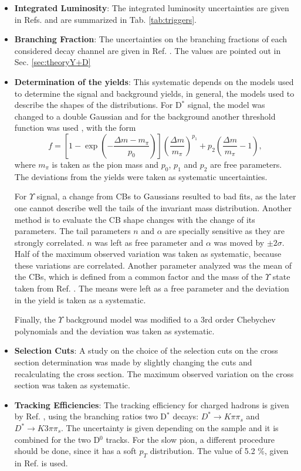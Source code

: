 \begin{itemize}
  \item \textbf{Integrated Luminosity}: The integrated luminosity uncertainties are given in Refs. \cite{CMS-PAS-LUM-17-001, CMS-PAS-LUM-17-004, CMS-PAS-LUM-18-002} and are summarized in Tab. \ref{tab:triggers}. 
  \item \textbf{Branching Fraction}: The uncertainties on the branching fractions of each considered decay channel are given in Ref. \cite{Workman:2022ynf}. The values are pointed out in Sec. \ref{sec:theoryY+D}
  \item \textbf{Determination of the yields}: This systematic depends on the models used to determine the signal and background yields, in general, the models used to describe the shapes of the distributions. For D$^*$ signal, the model was changed to a double Gaussian and for the background another threshold function was used \cite{CMS:2021lab}, with the form
  \begin{equation}
    f = \left[ 1- \exp{\left( -\frac{\Delta m - m_\pi}{p_0} \right)} \right]\left( \frac{\Delta m}{m_\pi} \right)^{p_1} +p_2 \left( \frac
    {\Delta m}{m_\pi} - 1 \right),
  \end{equation}
  where $m_\pi$ is taken as the pion mass and $p_0$, $p_1$ and $p_2$ are free parameters. The deviations from the yields were taken as systematic uncertainties.

  For $\Upsilon$ signal, a change from CBs to Gaussians resulted to bad fits, as the later one cannot describe well the tails of the invariant mass distribution. Another method is to evaluate the CB shape changes with the change of its parameters. The tail parameters $n$ and $\alpha$ are specially sensitive as they are strongly correlated. $n$ was left as free parameter and $\alpha$ was moved by $\pm 2\sigma$. Half of the maximum observed variation was taken as systematic, because these variations are correlated. Another parameter analyzed was the mean of the CBs, which is defined from a common factor and the mass of the $\Upsilon$ state taken from Ref. \cite{Workman:2022ynf}. The means were left as a free parameter and the deviation in the yield is taken as a systematic.

  Finally, the $\Upsilon$ background model was modified to a 3rd order Chebychev polynomials and the deviation was taken as systematic.
  \item \textbf{Selection Cuts}: A study on the choice of the selection cuts on the cross section determination was made by slightly changing the cuts and recalculating the cross section. The maximum observed variation on the cross section was taken as systematic.
  \item \textbf{Tracking Efficiencies}: The tracking efficiency for charged hadrons is given by Ref. \cite{CMS-DP-2022-012}, using the branching ratios two D$^*$ decays: $D^* \rightarrow K\pi\pi_s$ and $D^* \rightarrow K3\pi\pi_s$. The uncertainty is given depending on the sample and it is combined for the two D$^0$ tracks. For the slow pion, a different procedure should be done, since it has a soft $p_T$ distribution. The value of 5.2 \%, given in Ref. \cite{CMS:2021lab} is used.
\end{itemize}

